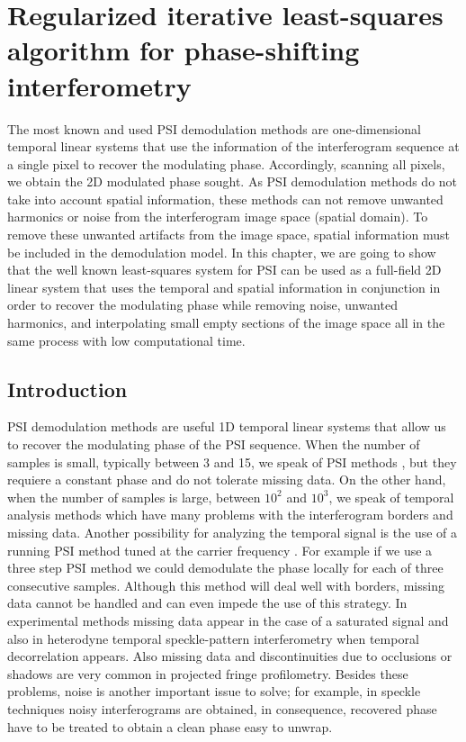 \chapter{Regularized iterative least-squares algorithm for phase-shifting
interferometry}

The most known and used PSI demodulation methods are one-dimensional temporal 
linear systems that use the information of the interferogram sequence at a single 
pixel to recover the modulating phase. Accordingly, scanning all pixels, we obtain 
the 2D modulated phase sought. As PSI demodulation methods do not take into account 
spatial information, these methods can not remove unwanted harmonics or noise from 
the interferogram image space (spatial domain). 
To remove these unwanted artifacts from the image 
space, spatial information must be included in the demodulation model. In this 
chapter, we are going to show that the well known least-squares system for PSI 
can be used as a full-field 2D linear system that uses the temporal and spatial 
information in conjunction in order to recover the modulating phase while removing 
noise, unwanted harmonics, and interpolating small empty sections of the image 
space all in the same process with low computational time.


\section{Introduction}

PSI demodulation methods are useful 1D
temporal linear systems that allow us to recover the modulating phase of the
PSI sequence. When the number of samples is small, typically between 3 and 15,
we speak of PSI methods \cite{Malacara,GeneralTheory}, but they requiere a
constant phase and do not tolerate missing data. On the other hand, when the
number of samples is large, between $10^2$ and $10^3$, we speak of temporal
analysis methods \cite{RQF,temporal_1,temporal_2} which have many problems with
the interferogram borders and missing data. Another possibility for analyzing
the temporal signal is the use of a running PSI method tuned at the carrier
frequency \cite{RQF,temporal_1,temporal_2,Mariano2,Medina,Zeng}. For example if
we use a three step PSI method we could demodulate the phase locally for each of
three consecutive samples. Although this method will deal well with borders,
missing data cannot be handled and can even impede the use of this strategy. In
experimental methods missing data appear in the case of a saturated signal and
also in heterodyne temporal speckle-pattern interferometry when temporal
decorrelation appears. Also missing data and discontinuities due to occlusions
or shadows are very common in projected fringe profilometry. Besides these
problems, noise is another important issue to solve; for example, in speckle
techniques \cite{Malacara,temporal_2} noisy interferograms are obtained, in
consequence, recovered phase have to be treated to obtain a clean phase easy to
unwrap.


